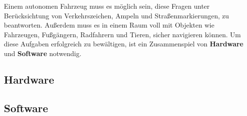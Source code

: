 Einem autonomen Fahrzeug muss es möglich sein, diese Fragen unter Berücksichtung von Verkehrszeichen, Ampeln und Straßenmarkierungen, zu beantworten. Außerdem muss es in einem Raum voll mit Objekten wie Fahrzeugen, Fußgängern, Radfahrern und Tieren, sicher navigieren können. Um diese Aufgaben erfolgreich zu bewältigen, ist ein Zusammenspiel von \textbf{Hardware} und \textbf{Software} notwendig.

\subsection{Hardware}

\subsection{Software}
